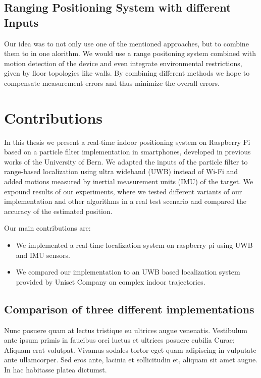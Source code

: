 \subsection{Ranging Positioning System with different Inputs}

Our idea was to not only use one of the mentioned approaches, but to combine them to in one alorithm. We would use a range positoning system combined with motion detection of the device and even integrate environmental restrictions, given by floor topologies like walls. By combining different methods we hope to compensate measurement errors and thus minimize the overall errors.



\section{Contributions}

In this thesis we present a real-time indoor positioning system on Raspberry Pi based on a particle filter implementation in smartphones, developed in previous works of the University of Bern. \cite{Carrera} We adapted the inputs of the particle filter to range-based localization using ultra wideband (UWB) instead of Wi-Fi and added motions measured by inertial measurement units (IMU) of the target.
We expound results of our experiments, where we tested different variants of our implementation and other algorithms in a real test scenario and compared the accuracy of the estimated position.

Our main contributions are:
\begin{itemize}
\item We implemented a real-time localization system on raspberry pi using UWB and IMU sensors. 
\item We compared our implementation to an UWB based localization system provided by Uniset Company on complex indoor trajectories.
\end{itemize}





\subsection{Comparison of three different implementations}

Nunc posuere quam at lectus tristique eu ultrices augue venenatis. Vestibulum ante ipsum primis in faucibus orci luctus et ultrices posuere cubilia Curae; Aliquam erat volutpat. Vivamus sodales tortor eget quam adipiscing in vulputate ante ullamcorper. Sed eros ante, lacinia et sollicitudin et, aliquam sit amet augue. In hac habitasse platea dictumst.


